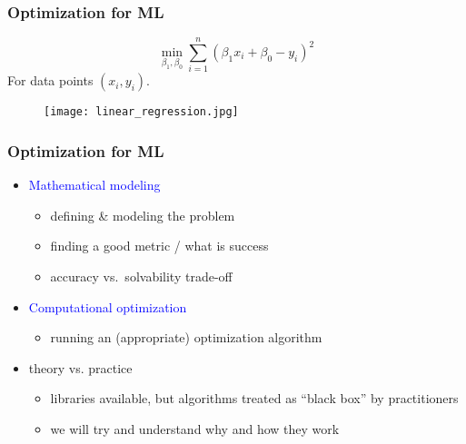\documentclass{beamer}
\begin{document}
\begin{frame}
  \frametitle{Optimization for ML}
  \begin{minipage}{0.5\textwidth}
    \begin{equation}
      \min_{\beta_1, \beta_0} \sum_{i=1}^{n} {( \beta_1 x_i + \beta_0 - y_i)}^2
    \end{equation}
    For data points $(x_i, y_i)$.
  \end{minipage}
  \hfill
  \begin{minipage}{0.45\textwidth}
    \begin{figure}[ht]
      \centering
      \texttt{[image: linear\_regression.jpg]}
    \end{figure}

  \end{minipage}


\end{frame}

\begin{frame}
  \frametitle{Optimization for ML}
  \begin{itemize}
    \item \textcolor{blue}{Mathematical modeling}
          \begin{itemize}
            \item defining \& modeling the problem
            \item finding a good metric / what is success
            \item accuracy vs.\ solvability trade-off
          \end{itemize}
    \item \textcolor{blue}{Computational optimization}
         \begin{itemize}
           \item running an (appropriate) optimization algorithm
         \end{itemize}
    \item theory vs. practice
          \begin{itemize}
            \item libraries available, but algorithms treated as ``black box'' by practitioners
            \item we will try and understand why and how they work
          \end{itemize}
  \end{itemize}
\end{frame}
\end{document}
